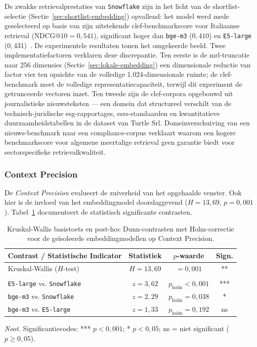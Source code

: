 De zwakke retrievalprestaties van \texttt{Snowflake} zijn in het licht van de shortlist-selectie (Sectie~\ref{sec:shortlist-embedding}) opvallend: het model werd mede geselecteerd op basis van zijn uitstekende \gls{clef}-benchmarkscore voor Italiaanse retrieval ($\text{NDCG@10} = 0{,}541$), significant hoger dan \texttt{bge-m3} ($0{,}410$) en \texttt{E5-large} ($0{,}431$)~\autocite{YuEtAl2024}. De experimentele resultaten tonen het omgekeerde beeld. Twee implementatiefactoren verklaren deze discrepantie. Ten eerste is de \gls{mrl}-truncatie naar 256 dimensies (Sectie~\ref{sec:lokale-embedding}) een dimensionale reductie van factor vier ten opzichte van de volledige 1.024-dimensionale ruimte; de \gls{clef}-benchmark meet de volledige representatiecapaciteit, terwijl dit experiment de getrunceerde vectoren inzet. Ten tweede zijn de \gls{clef}-corpora opgebouwd uit journalistieke nieuwsteksten — een domein dat structureel verschilt van de technisch-juridische \gls{esg}-rapportages, \gls{esrs}-standaarden en kwantitatieve duurzaamheidstabellen in de dataset van Turtle Srl. Domeinverschuiving van een nieuws-benchmark naar een compliance-corpus verklaart waarom een hogere benchmarkscore voor algemene meertalige retrieval geen garantie biedt voor sectorspecifieke retrievalkwaliteit.

\subsubsection{Context Precision}

De \textit{Context Precision} evalueert de zuiverheid van het opgehaalde venster. Ook hier is de invloed van het embeddingmodel doorslaggevend ($H = 13{,}69$, $p = 0{,}001$). Tabel~\ref{tab:stats-embedder-precision} documenteert de statistisch significante contrasten.

\begin{table}[!htb]
\centering
\begin{tabularx}{\textwidth}{@{}Xccc@{}}
\toprule
\textbf{Contrast / Statistische Indicator} & \textbf{Statistiek} & \textbf{$p$-waarde} & \textbf{Sign.} \\ \midrule
Kruskal-Wallis ($H$-test)                         & $H = 13{,}69$ & $= 0{,}001$                 & ** \\  \\[0.5em]
\texttt{E5-large} vs. \texttt{Snowflake}          & $z = 3{,}62$  & $p_{\text{holm}} < 0{,}001$ & *** \\
\texttt{bge-m3} vs. \texttt{Snowflake}            & $z = 2{,}29$  & $p_{\text{holm}} = 0{,}038$ & * \\
\texttt{bge-m3} vs. \texttt{E5-large}             & $z = 1{,}33$  & $p_{\text{holm}} = 0{,}192$ & ns \\
\bottomrule
\end{tabularx}
\textit{Noot.} Significantiecodes: *** $p < 0{,}001$; * $p < 0{,}05$; ns = niet significant ($p \geq 0{,}05$).
\caption[KW + Dunn-post-hoc: Embedder op Context Precision]{Kruskal-Wallis basistoets en post-hoc Dunn-contrasten met Holm-correctie voor de geïsoleerde embeddingmodellen op Context Precision.}
\label{tab:stats-embedder-precision}
\end{table}

